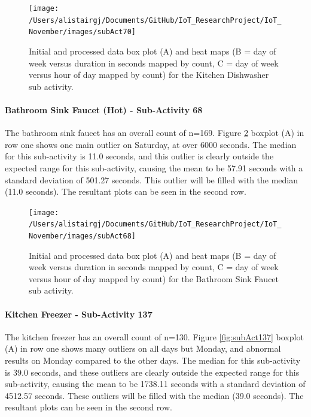 \documentclass[11pt,]{article}
\let\oldparagraph\paragraph
\renewcommand{\paragraph}[1]{\oldparagraph{#1}\mbox{}}
\begin{document}
\begin{figure}[H]

{\centering \texttt{[image: /Users/alistairgj/Documents/GitHub/IoT\_ResearchProject/IoT\_November/images/subAct70]} 

}

\caption{Initial and processed data box plot (A) and heat maps (B = day of week versus duration in seconds mapped by count, C = day of week versus hour of day mapped by count) for the Kitchen Dishwasher sub activity.}\label{fig:subAct70}
\end{figure}

\hypertarget{bathroom-sink-faucet-hot---sub-activity-68}{%
\paragraph{Bathroom Sink Faucet (Hot) - Sub-Activity
68}\label{bathroom-sink-faucet-hot---sub-activity-68}}

The bathroom sink faucet has an overall count of n=169. Figure
\ref{fig:subAct68} boxplot (A) in row one shows one main outlier on
Saturday, at over 6000 seconds. The median for this sub-activity is 11.0
seconds, and this outlier is clearly outside the expected range for this
sub-activity, causing the mean to be 57.91 seconds with a standard
deviation of 501.27 seconds. This outlier will be filled with the median
(11.0 seconds). The resultant plots can be seen in the second row.

\begin{figure}[H]

{\centering \texttt{[image: /Users/alistairgj/Documents/GitHub/IoT\_ResearchProject/IoT\_November/images/subAct68]} 

}

\caption{Initial and processed data box plot (A) and heat maps (B = day of week versus duration in seconds mapped by count, C = day of week versus hour of day mapped by count) for the Bathroom Sink Faucet sub activity.}\label{fig:subAct68}
\end{figure}

\hypertarget{kitchen-freezer---sub-activity-137}{%
\paragraph{Kitchen Freezer - Sub-Activity
137}\label{kitchen-freezer---sub-activity-137}}

The kitchen freezer has an overall count of n=130. Figure
\ref{fig:subAct137} boxplot (A) in row one shows many outliers on all
days but Monday, and abnormal results on Monday compared to the other
days. The median for this sub-activity is 39.0 seconds, and these
outliers are clearly outside the expected range for this sub-activity,
causing the mean to be 1738.11 seconds with a standard deviation of
4512.57 seconds. These outliers will be filled with the median (39.0
seconds). The resultant plots can be seen in the second row.
\end{document}
